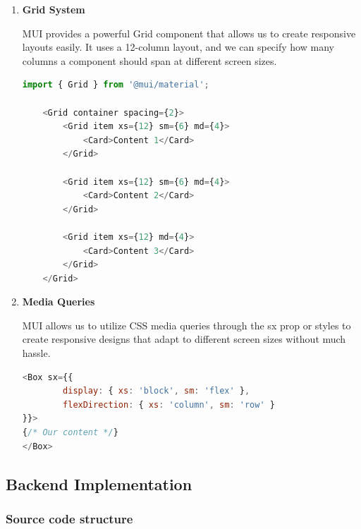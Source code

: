 	\begin{enumerate}
		\item \textbf{Grid System}
		
		MUI provides a powerful Grid component that allows us to create responsive layouts easily. It uses a 12-column layout, and we can specify how many columns a component should span at different screen sizes.


\begin{lstlisting}[language=Javascript, breaklines=true, caption=MUI Grid System]
import { Grid } from '@mui/material';

	<Grid container spacing={2}>
		<Grid item xs={12} sm={6} md={4}>
			<Card>Content 1</Card>
		</Grid>
		
		<Grid item xs={12} sm={6} md={4}>
			<Card>Content 2</Card>
		</Grid>
	
		<Grid item xs={12} md={4}>
			<Card>Content 3</Card>
		</Grid>
	</Grid>
\end{lstlisting}		

	\item \textbf{Media Queries}
	
	MUI allows us to utilize CSS media queries through the sx prop or styles to create responsive designs that adapt to different screen sizes without much hassle.

\begin{lstlisting}[language=Javascript, breaklines=true, caption=MUI Media Queries]
<Box sx={{ 
		display: { xs: 'block', sm: 'flex' }, 
		flexDirection: { xs: 'column', sm: 'row' } 
}}>
{/* Our content */}
</Box>

\end{lstlisting}	


	\end{enumerate}
	
	
\newpage
\subsection{Backend Implementation}
	\subsubsection{Source code structure}
	
